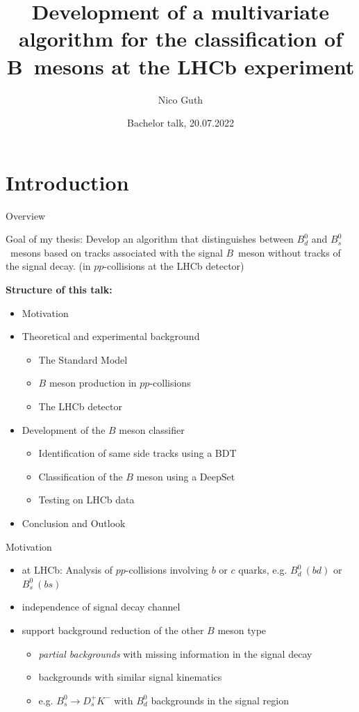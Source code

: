 \documentclass[aspectratio=1610, 10pt]{beamer}
\title{Development of a multivariate algorithm for the classification of B~mesons at the LHCb experiment}
\author[N.~Guth]{Nico Guth}
\institute[AG Albrecht]{Arbeitsgruppe Albrecht \\ Fakultät Physik}
\date{Bachelor talk, 20.07.2022}
\begin{document}
\maketitle

\section*{Introduction}

\begin{frame}{Overview}
  \begin{block}{Goal of my thesis:}
    Develop an algorithm that distinguishes between $B^0_d$ and $B^0_s$~mesons based on tracks associated with the signal $B$~meson without tracks of the signal decay. (in $pp$-collisions at the LHCb detector) 
  \end{block}

  \medskip
  \textbf{Structure of this talk:}
  \begin{itemize}
    \item Motivation
    \item Theoretical and experimental background
      \begin{itemize}
        \item The Standard Model
        \item $B$ meson production in $pp$-collisions
        \item The LHCb detector
      \end{itemize}
    \item Development of the $B$ meson classifier
      \begin{itemize}
        \item Identification of same side tracks using a BDT
        \item Classification of the $B$ meson using a DeepSet
        \item Testing on LHCb data
      \end{itemize}
    \item Conclusion and Outlook
  \end{itemize}

\end{frame}

\begin{frame}{Motivation}
  \begin{itemize}
    \item at LHCb: Analysis of $pp$-collisions involving $b$ or $c$ quarks, e.g. $B^0_d \: (bd)$ or $B^0_s \: (bs)$
    \item independence of signal decay channel
    \item support background reduction of the other $B$ meson type
    \begin{itemize}
      \item \textit{partial backgrounds} with missing information in the signal decay
      \item backgrounds with similar signal kinematics
      \item e.g. $B^0_s \rightarrow D^+_s K^-$ with $B^0_d$ backgrounds in the signal region
    \end{itemize}
  \end{itemize}
\end{frame}
\end{document}
